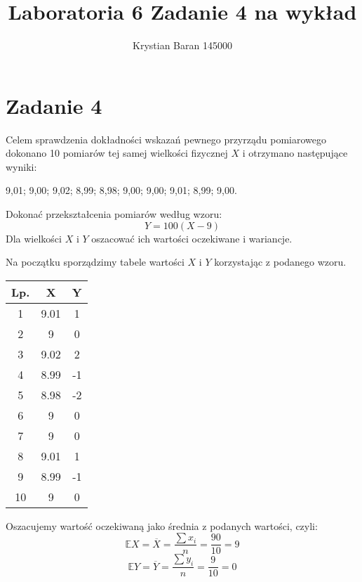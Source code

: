 \documentclass{article}
\author{Krystian Baran 145000}
\title{Laboratoria 6 Zadanie 4 na wykład}
\begin{document}
\maketitle
\newpage

\section{Zadanie 4}
Celem sprawdzenia dokładności wskazań pewnego przyrządu pomiarowego dokonano 10
pomiarów tej samej wielkości fizycznej $X$ i otrzymano następujące wyniki: \\
\begin{center}
9,01; 9,00; 9,02; 8,99; 8,98; 9,00; 9,00; 9,01; 8,99; 9,00.
\end{center}
Dokonać przekształcenia pomiarów według wzoru:
\[ Y = 100(X - 9) \]
Dla wielkości $X$ i $Y$ oszacować ich wartości oczekiwane i wariancje. \\ \par

Na początku sporządzimy tabele wartości $X$ i $Y$ korzystając z podanego wzoru.
\begin{center}
\begin{tabular}{|c|c|c|}
\hline
Lp. & X & Y \\ \hline
1 & 9.01	& 1 \\ \hline
2& 9 &	0 \\ \hline
3 &9.02	& 2 \\ \hline
4 & 8.99	& -1\\ \hline
5 & 8.98	& -2\\ \hline
6 & 9	 &0\\ \hline
7 & 9	&0\\ \hline
8 & 9.01	&1\\ \hline
9 & 8.99	&-1\\ \hline
10 & 9	&0\\ \hline
\end{tabular}
\end{center}
Oszacujemy wartość oczekiwaną jako średnia z podanych wartości, czyli:
\[ \mathbb{E}X = \overline{X} = \frac{\sum x_i}{n} = \frac{90}{10} = 9 \]
\[ \mathbb{E}Y = \overline{Y} = \frac{\sum y_i}{n} = \frac{9}{10} = 0 \]
\end{document}
